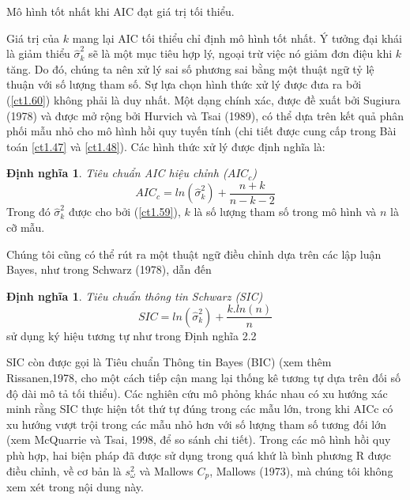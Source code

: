 \documentclass[12pt, a4paper,oneside]{book}
\theoremstyle{definition}
\newtheorem{dn}[theo]{Định nghĩa}
\begin{document}
Mô hình tốt nhất khi AIC đạt giá trị tối thiểu.

Giá trị của $ k $ mang lại AIC tối thiểu chỉ định mô hình tốt nhất. Ý tưởng đại khái là giảm thiểu $ \hat{\sigma}_{k}^{2} $ sẽ là một mục tiêu hợp lý, ngoại trừ việc nó giảm đơn điệu khi $ k $ tăng. Do đó, chúng ta nên xử lý sai số phương sai  bằng một thuật ngữ tỷ lệ thuận với số lượng tham số. Sự lựa chọn hình thức xử lý được đưa ra bởi (\ref{ct1.60}) không phải là duy nhất. Một dạng chính xác, được đề xuất bởi Sugiura (1978) và được mở rộng bởi Hurvich và Tsai (1989), có thể dựa trên kết quả phân phối mẫu nhỏ cho mô hình hồi quy tuyến tính (chi tiết được cung cấp trong Bài toán \ref{ct1.47} và \ref{ct1.48}). Các hình thức xử lý được định nghĩa là:
\begin{dn}	
	\textit{Tiêu chuẩn AIC hiệu chỉnh ($AIC_{c}$)}
	\begin{equation}
	AIC_{c}= ln (\hat{\sigma}_{k}^{2}) +\dfrac{n+ k}{n-k-2} \label{ct1.61}
	\end{equation} 
	Trong đó $ \hat{\sigma}_{k}^{2} $ được cho bởi (\ref{ct1.59}), $ k $ là số lượng tham số trong mô hình và $ n $ là cỡ mẫu.
	
\end{dn}
Chúng tôi cũng có thể rút ra một thuật ngữ điều chỉnh dựa trên các lập luận Bayes, như trong Schwarz (1978), dẫn đến
\begin{dn}	
	\textit{Tiêu chuẩn thông tin Schwarz (SIC)} 
	\begin{equation}
	SIC= ln (\hat{\sigma}_{k}^{2}) +\dfrac{k.ln(n)}{n} \label{ct1.62}
	\end{equation}
	sử dụng ký hiệu tương tự như trong Định nghĩa 2.2
\end{dn}
SIC còn được gọi là Tiêu chuẩn Thông tin Bayes (BIC) (xem thêm Rissanen,1978, cho một cách tiếp cận mang lại thống kê tương tự dựa trên đối số độ dài mô tả tối thiểu). Các nghiên cứu mô phỏng khác nhau có xu hướng xác minh rằng SIC thực hiện tốt thứ tự đúng trong các mẫu lớn, trong khi AICc có xu hướng vượt trội trong các mẫu nhỏ hơn với số lượng tham số tương đối lớn (xem McQuarrie và Tsai, 1998, để so sánh chi tiết). Trong các mô hình hồi quy phù hợp, hai biện pháp đã được sử dụng trong quá khứ là bình phương R được điều chỉnh, về cơ bản là $ s_{\omega}^2 $ và Mallows $ C_{p} $, Mallows (1973), mà chúng tôi không xem xét trong nội dung này.
\end{document}
